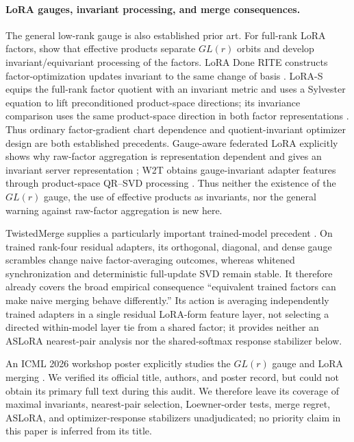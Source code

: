 \paragraph{LoRA gauges, invariant processing, and merge consequences.}
The general low-rank gauge is also established prior art.  For full-rank LoRA
factors, \citet{putterman2024learning} show that effective products separate
$GL(r)$ orbits and develop invariant/equivariant processing of the factors.
LoRA Done RITE constructs factor-optimization updates invariant to the same
change of basis \citep{yen2025lora}.
LoRA-S equips the full-rank factor quotient with an invariant metric and uses
a Sylvester equation to lift preconditioned product-space directions;
its invariance comparison uses the same product-space direction in both
factor representations \citep{zheng2026loras}.  Thus ordinary factor-gradient chart dependence and
quotient-invariant optimizer design are both established precedents.
Gauge-aware federated LoRA explicitly
shows why raw-factor aggregation is representation dependent and gives an
invariant server representation \citep{chen2026beyond}; W2T obtains
gauge-invariant adapter features through product-space QR--SVD processing
\citep{han2026w2t}.  Thus neither the existence of the $GL(r)$ gauge, the use
of effective products as invariants, nor the general warning against
raw-factor aggregation is new here.

TwistedMerge supplies a particularly important trained-model precedent
\citep{gong2026twistedmerge}.  On trained rank-four residual adapters, its
orthogonal, diagonal, and dense gauge scrambles change naive factor-averaging
outcomes, whereas whitened synchronization and deterministic full-update SVD
remain stable.  It therefore already covers the broad empirical consequence
``equivalent trained factors can make naive merging behave differently.''
Its action is averaging independently trained adapters in a single residual
LoRA-form feature layer, not selecting a directed within-model layer tie from
a shared factor; it provides neither an ASLoRA nearest-pair analysis nor the
shared-softmax response stabilizer below.

An ICML 2026 workshop poster explicitly studies the $GL(r)$ gauge and LoRA
merging \citep{karuturi2026gl}.  We verified its official title, authors, and
poster record, but could not obtain its primary full text during this audit.
We therefore leave its coverage of maximal invariants, nearest-pair selection,
Loewner-order tests, merge regret, ASLoRA, and optimizer-response stabilizers
unadjudicated; no priority claim in this paper is inferred from its title.

